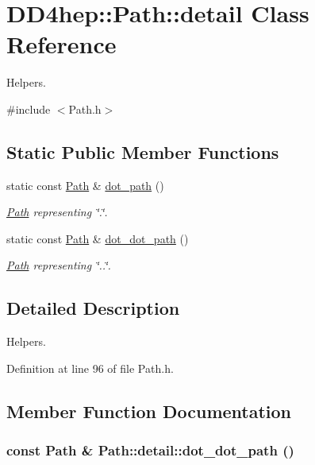 \hypertarget{class_d_d4hep_1_1_path_1_1detail}{
\section{DD4hep::Path::detail Class Reference}
\label{class_d_d4hep_1_1_path_1_1detail}
}


Helpers.  


{\ttfamily \#include $<$Path.h$>$}\subsection*{Static Public Member Functions}
\begin{DoxyCompactItemize}
\item 
static const \hyperlink{class_d_d4hep_1_1_path}{Path} \& \hyperlink{class_d_d4hep_1_1_path_1_1detail_ab5518d01c92d39c37cb48ad8ffeb5aa5}{dot\_\-path} ()
\begin{DoxyCompactList}\small\item\em \hyperlink{class_d_d4hep_1_1_path}{Path} representing \char`\"{}.\char`\"{}. \item\end{DoxyCompactList}\item 
static const \hyperlink{class_d_d4hep_1_1_path}{Path} \& \hyperlink{class_d_d4hep_1_1_path_1_1detail_aa0c12c175ecacc65564503611c576038}{dot\_\-dot\_\-path} ()
\begin{DoxyCompactList}\small\item\em \hyperlink{class_d_d4hep_1_1_path}{Path} representing \char`\"{}..\char`\"{}. \item\end{DoxyCompactList}\end{DoxyCompactItemize}


\subsection{Detailed Description}
Helpers. 

Definition at line 96 of file Path.h.

\subsection{Member Function Documentation}
\hypertarget{class_d_d4hep_1_1_path_1_1detail_aa0c12c175ecacc65564503611c576038}{
\subsubsection[{dot\_\-dot\_\-path}]{\setlength{\rightskip}{0pt plus 5cm}const {\bf Path} \& Path::detail::dot\_\-dot\_\-path ()}}
\label{class_d_d4hep_1_1_path_1_1detail_aa0c12c175ecacc65564503611c576038}


